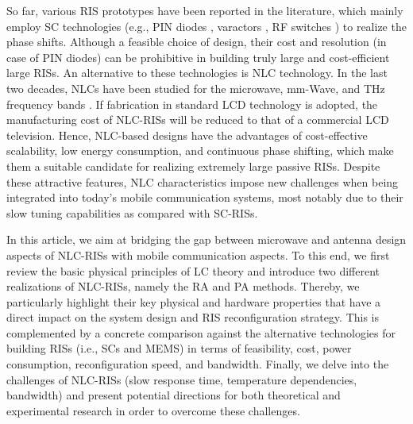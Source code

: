     So far, various \gls{RIS} prototypes have been reported in the literature, which mainly employ \gls{SC} technologies (e.g., \gls{PIN} diodes \cite{tang2020wireless}, varactors \cite{alamzadeh2021reconfigurable}, %
    \gls{RF} switches \cite{rossanese2022designing}) to realize the phase shifts. Although a feasible choice of design, their cost and resolution (in case of \gls{PIN} diodes) can be prohibitive in building truly large and cost-efficient large \glspl{RIS}. An alternative to these technologies is \gls{NLC} technology. In the last two decades, \glspl{NLC} have been studied for the microwave, \gls{mm-Wave}, and THz frequency bands \cite[Ch. 5]{ferrari2022reconfigurable}. %
    If fabrication in standard \gls{LCD} technology is adopted, the manufacturing cost of \gls{NLC}-\glspl{RIS} will be reduced to that of a commercial \gls{LCD} television. Hence, \gls{NLC}-based designs have the advantages of cost-effective scalability, low energy consumption, and continuous phase shifting, which make them a suitable candidate for realizing extremely large passive \glspl{RIS}. Despite these attractive features, \gls{NLC} characteristics impose new challenges when being integrated into today's mobile communication systems, most notably due to their slow tuning capabilities as compared with \gls{SC}-\glspl{RIS}.

In this article, we aim at bridging the gap between microwave and antenna design aspects of \gls{NLC}-\glspl{RIS} with mobile communication aspects. To this end, we first review the basic physical principles of LC theory and introduce two different realizations of \gls{NLC}-\glspl{RIS}, namely the \gls{RA} and \gls{PA} methods. Thereby, we particularly highlight their key physical and hardware properties that have a direct impact on the system design and RIS reconfiguration strategy. This is complemented by a concrete comparison against the alternative technologies for building RISs (i.e., \glspl{SC} and \gls{MEMS})  in terms of feasibility, cost, power consumption, reconfiguration speed, and bandwidth. Finally, we delve into the challenges of \gls{NLC}-\glspl{RIS} (slow response time, temperature dependencies, bandwidth) and present potential directions for both theoretical and experimental research in order to overcome these challenges.





